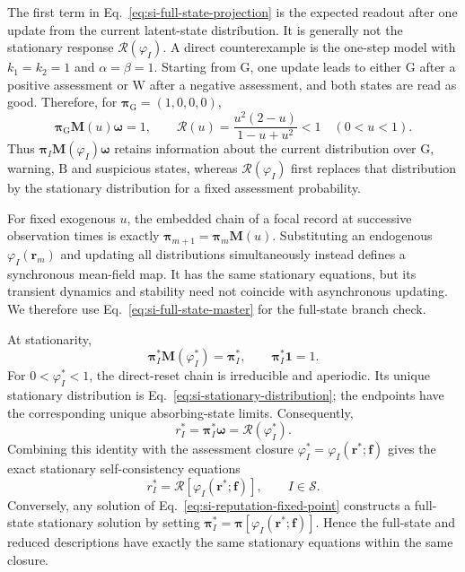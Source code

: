 \documentclass[fleqn,10pt]{wlscirep}
\begin{document}
The first term in Eq.~\eqref{eq:si-full-state-projection} is the expected readout after one update from the current latent-state distribution. It is generally not the stationary response $\mathcal R(\varphi_I)$. A direct counterexample is the one-step model with $k_1=k_2=1$ and $\alpha=\beta=1$. Starting from $\mathrm G$, one update leads to either $\mathrm G$ after a positive assessment or $\mathrm W$ after a negative assessment, and both states are read as good. Therefore, for $\boldsymbol\pi_{\mathrm G}=(1,0,0,0)$,
\begin{equation}
\boldsymbol\pi_{\mathrm G}\mathbf M(u)\boldsymbol\omega=1,
\qquad
\mathcal R(u)=\frac{u^2(2-u)}{1-u+u^2}<1
\quad (0<u<1).
\label{eq:si-one-step-versus-stationary}
\end{equation}
Thus $\boldsymbol\pi_I\mathbf M(\varphi_I)\boldsymbol\omega$ retains information about the current distribution over $\mathrm G$, warning, $\mathrm B$ and suspicious states, whereas $\mathcal R(\varphi_I)$ first replaces that distribution by the stationary distribution for a fixed assessment probability.

For fixed exogenous $u$, the embedded chain of a focal record at successive observation times is exactly $\boldsymbol\pi_{m+1}=\boldsymbol\pi_m\mathbf M(u)$. Substituting an endogenous $\varphi_I(\boldsymbol r_m)$ and updating all distributions simultaneously instead defines a synchronous mean-field map. It has the same stationary equations, but its transient dynamics and stability need not coincide with asynchronous updating. We therefore use Eq.~\eqref{eq:si-full-state-master} for the full-state branch check.

At stationarity,
\begin{equation}
\boldsymbol\pi_I^*\mathbf M(\varphi_I^*)=\boldsymbol\pi_I^*,
\qquad \boldsymbol\pi_I^*\boldsymbol 1=1.
\label{eq:si-full-state-stationary}
\end{equation}
For $0<\varphi_I^*<1$, the direct-reset chain is irreducible and aperiodic. Its unique stationary distribution is Eq.~\eqref{eq:si-stationary-distribution}; the endpoints have the corresponding unique absorbing-state limits. Consequently,
\begin{equation}
r_I^*=\boldsymbol\pi_I^*\boldsymbol\omega=\mathcal R(\varphi_I^*).
\label{eq:si-full-state-consistency}
\end{equation}
Combining this identity with the assessment closure $\varphi_I^*=\varphi_I(\boldsymbol r^*;\boldsymbol f)$ gives the exact stationary self-consistency equations
\begin{equation}
r_I^*=\mathcal R[\varphi_I(\boldsymbol r^*;\boldsymbol f)],
\qquad I\in\mathcal S.
\label{eq:si-reputation-fixed-point}
\end{equation}
Conversely, any solution of Eq.~\eqref{eq:si-reputation-fixed-point} constructs a full-state stationary solution by setting $\boldsymbol\pi_I^*=\boldsymbol\pi[\varphi_I(\boldsymbol r^*;\boldsymbol f)]$. Hence the full-state and reduced descriptions have exactly the same stationary equations within the same closure.
\end{document}
